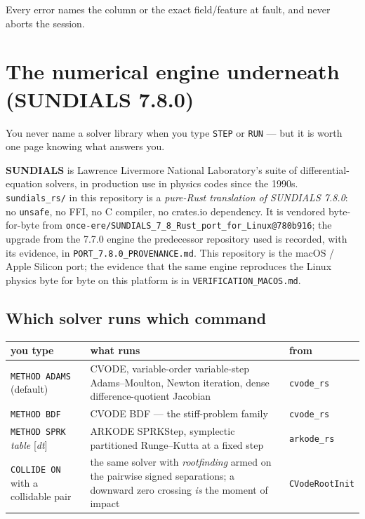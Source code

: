 \documentclass[11pt]{article}
\newcommand{\kw}[1]{\texttt{\uppercase{#1}}}
\newcommand{\code}[1]{\texttt{#1}}
\begin{document}
Every error names the column or the exact field/feature at fault, and
never aborts the session.

\section{The numerical engine underneath (SUNDIALS 7.8.0)}

You never name a solver library when you type \kw{step} or \kw{run} ---
but it is worth one page knowing what answers you.

\textbf{SUNDIALS} is Lawrence Livermore National Laboratory's suite of
differential-equation solvers, in production use in physics codes since
the 1990s. \code{sundials\_rs/} in this repository is a \emph{pure-Rust
translation of SUNDIALS 7.8.0}: no \code{unsafe}, no FFI, no C compiler,
no crates.io dependency. It is vendored byte-for-byte from
\code{once-ere/SUNDIALS\_7\_8\_Rust\_port\_for\_Linux@780b916}; the
upgrade from the 7.7.0 engine the predecessor repository used is
recorded, with its evidence, in \code{PORT\_7.8.0\_PROVENANCE.md}.
This repository is the macOS / Apple Silicon port; the evidence that
the same engine reproduces the Linux physics byte for byte on this
platform is in \code{VERIFICATION\_MACOS.md}.

\subsection{Which solver runs which command}

\begin{center}
\begin{tabular}{p{4.6cm}p{7.4cm}p{2.2cm}}
\textbf{you type} & \textbf{what runs} & \textbf{from}\\\hline
\kw{method adams} (default) & CVODE, variable-order variable-step
Adams--Moulton, Newton iteration, dense difference-quotient Jacobian &
\code{cvode\_rs}\\
\kw{method bdf} & CVODE BDF --- the stiff-problem family &
\code{cvode\_rs}\\
\kw{method sprk} \emph{table} [\emph{dt}] & ARKODE SPRKStep, symplectic
partitioned Runge--Kutta at a fixed step & \code{arkode\_rs}\\
\kw{collide on} with a collidable pair & the same solver with
\emph{rootfinding} armed on the pairwise signed separations; a downward
zero crossing \emph{is} the moment of impact &
\code{CVodeRootInit}\\
\end{tabular}
\end{center}
\end{document}
